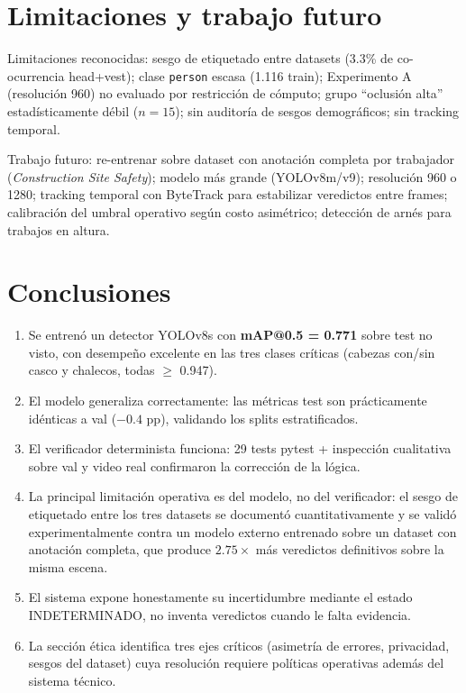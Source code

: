 \documentclass[conference]{IEEEtran}
\begin{document}
\section{Limitaciones y trabajo futuro}

Limitaciones reconocidas: sesgo de etiquetado entre datasets (3.3\%
de co-ocurrencia head+vest); clase \texttt{person} escasa
(1.116 train); Experimento A (resolución 960) no evaluado por
restricción de cómputo; grupo ``oclusión alta'' estadísticamente
débil ($n=15$); sin auditoría de sesgos demográficos; sin tracking
temporal.

Trabajo futuro: re-entrenar sobre dataset con anotación completa por
trabajador (\emph{Construction Site Safety}); modelo más grande
(YOLOv8m/v9); resolución 960 o 1280; tracking temporal con
ByteTrack para estabilizar veredictos entre frames; calibración del
umbral operativo según costo asimétrico; detección de arnés para
trabajos en altura.

\section{Conclusiones}

\begin{enumerate}
    \item Se entrenó un detector YOLOv8s con \textbf{mAP@0.5 = 0.771}
    sobre test no visto, con desempeño excelente en las tres clases
    críticas (cabezas con/sin casco y chalecos, todas $\geq$ 0.947).

    \item El modelo generaliza correctamente: las métricas test son
    prácticamente idénticas a val ($-0.4$ pp), validando los splits
    estratificados.

    \item El verificador determinista funciona: 29 tests pytest +
    inspección cualitativa sobre val y video real confirmaron la
    corrección de la lógica.

    \item La principal limitación operativa es del modelo, no del
    verificador: el sesgo de etiquetado entre los tres datasets se
    documentó cuantitativamente y se validó experimentalmente
    contra un modelo externo entrenado sobre un dataset con
    anotación completa, que produce $2.75\times$ más veredictos
    definitivos sobre la misma escena.

    \item El sistema expone honestamente su incertidumbre mediante
    el estado INDETERMINADO, no inventa veredictos cuando le falta
    evidencia.

    \item La sección ética identifica tres ejes críticos
    (asimetría de errores, privacidad, sesgos del dataset) cuya
    resolución requiere políticas operativas además del sistema
    técnico.
\end{enumerate}
\end{document}

